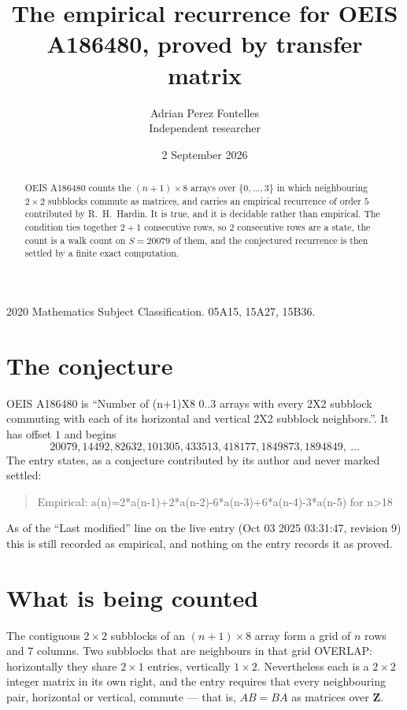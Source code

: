 \documentclass[11pt,a4paper]{article}
\title{The empirical recurrence for OEIS A186480, proved by transfer matrix}
\author{Adrian Perez Fontelles\\ \small Independent researcher}
\date{2 September 2026}
\theoremstyle{plain}
\theoremstyle{definition}
\begin{document}
\maketitle

\begin{abstract}
OEIS A186480 counts the $(n+1)\times8$ arrays over $\{0,\dots,3\}$ in which
neighbouring $2\times2$ subblocks commute as matrices, and carries an empirical
recurrence
of order $5$ contributed by R.~H.~Hardin. It is true, and it is decidable rather than
empirical. The condition ties together $2+1$ consecutive rows, so $2$ consecutive rows are
a state, the count is a walk count on $S=20079$ of them, and the conjectured recurrence is then
settled by a finite exact computation.
\end{abstract}

\noindent\small 2020 Mathematics Subject Classification. 05A15, 15A27, 15B36.\normalsize

\section{The conjecture}

OEIS A186480 is ``Number of (n+1)X8 0..3 arrays with every 2X2 subblock commuting with each of its horizontal and vertical 2X2 subblock neighbors.''. It has offset $1$ and begins
\[
20079, 14492, 82632, 101305, 433513, 418177, 1849873, 1894849,\ \dots
\]
The entry states, as a conjecture contributed by its author and never marked settled:
\begin{quote}
Empirical: a(n)=2*a(n-1)+2*a(n-2)-6*a(n-3)+6*a(n-4)-3*a(n-5) for n>18
\end{quote}
As of the ``Last modified'' line on the live entry (Oct 03 2025 03:31:47, revision 9) this is still
recorded as empirical, and nothing on the entry records it as proved.

\section{What is being counted}

The contiguous $2\times2$ subblocks of an $(n+1)\times8$ array form a grid of $n$
rows and $7$ columns. Two subblocks that are neighbours in that
grid OVERLAP: horizontally they share $2\times1$ entries, vertically
$1\times2$. Nevertheless each is a $2\times2$ integer matrix in its own right, and
the entry requires that every neighbouring pair, horizontal or vertical, commute --- that is,
$AB=BA$ as matrices over $\mathbf{Z}$.
\end{document}
